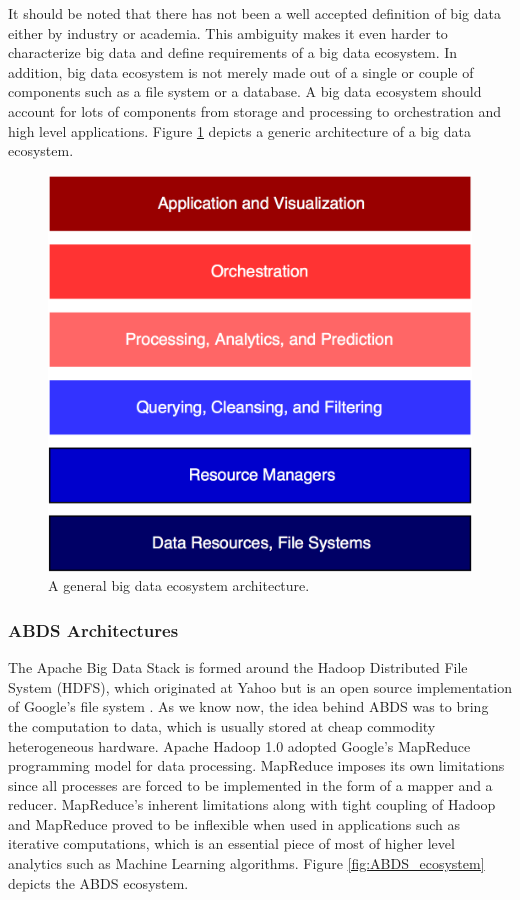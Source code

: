 \documentclass[runningheads,a4paper]{llncs}
\begin{document}
It should be noted that there has not been a well accepted definition of big data either by industry or academia. This ambiguity makes it even harder to characterize big data and define requirements of a big data ecosystem. In addition, big data ecosystem is not merely made out of a single or couple of components such as a file system or a database. A big data ecosystem should account for lots of components from storage and processing to orchestration and high level applications. Figure \ref{fig:bigdata_ecosystem} depicts a generic architecture of a big data ecosystem.

\begin{figure}
	\includegraphics[scale=0.23]{./images/bigdata_ecosystem.png}
	\centering
	\caption{A general big data ecosystem architecture.}
	\label{fig:bigdata_ecosystem}
\end{figure}



\subsubsection*{ABDS Architectures}
The Apache Big Data Stack is formed around the Hadoop Distributed File System (HDFS), which originated at Yahoo but is an open source implementation of Google's file system \cite{shvachko2010hadoop} \cite{ghemawat2003google}. As we know now, the idea behind ABDS was to bring the computation to data, which is usually stored at cheap commodity heterogeneous hardware. Apache Hadoop 1.0 adopted Google's MapReduce programming model for data processing. MapReduce imposes its own limitations since all processes are forced to be implemented in the form of a mapper and a reducer. MapReduce's inherent limitations along with tight coupling of Hadoop and MapReduce proved to be inflexible when used in applications such as iterative computations, which is an essential piece of most of higher level analytics such as Machine Learning algorithms. Figure \ref{fig:ABDS_ecosystem} depicts the ABDS ecosystem.\\
\end{document}
